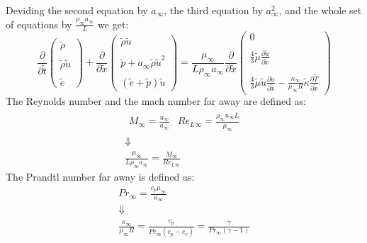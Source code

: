 \documentclass[11pt, a4paper]{article}
\newcommand{\parder}[2]{\frac{\partial {#1}}{\partial {#2}}}
\begin{document}
Deviding the second equation by $a_\infty$, the third equation by $a_\infty^2$, and the whole set of equations by $\displaystyle\frac{\rho_\infty a_\infty}{L}$ we get:
\begin{equation}
    \parder{}{\tilde{t}}\begin{pmatrix}
        \tilde{\rho} \\\\
        \tilde{\rho}\tilde{u} \\\\
        \tilde{e}
    \end{pmatrix}+\parder{}{\tilde{x}}\begin{pmatrix}
        \tilde{\rho}\tilde{u} \\\\
        \tilde{p}+a_\infty\tilde{\rho}\tilde{u}^2 \\\\
        \left(\tilde{e}+\tilde{p}\right)\tilde{u}
    \end{pmatrix}=\frac{\mu_\infty}{L\rho_\infty a_\infty}\parder{}{\tilde{x}}\begin{pmatrix}
        0 \\\\
        \displaystyle\frac{4}{3}\tilde{\mu} \parder{\tilde{u}}{\tilde{x}} \\\\
        \displaystyle\frac{4}{3}\tilde{\mu}\tilde{u}\parder{\tilde{u}}{\tilde{x}}-\frac{\kappa_\infty}{\mu_\infty R}\tilde{\kappa}\parder{\tilde{T}}{\tilde{x}}
    \end{pmatrix}
\end{equation}
The Reynolds number and the mach number far away are defined as:
\begin{equation}
    \begin{array}{c}
        \begin{matrix}
            \displaystyle M_\infty=\frac{u_\infty}{a_\infty} & \displaystyle Re_{L\infty}=\frac{\rho_\infty u_\infty L}{\mu_\infty}
        \end{matrix} \\
        \Downarrow \\
        \displaystyle \frac{\mu_\infty}{L\rho_\infty a_\infty}=\frac{M_\infty}{Re_{L\infty}}
    \end{array}
\end{equation}
The Prandtl number far away is defined as:
\begin{equation}
    \begin{array}{c}
        \displaystyle Pr_\infty=\frac{c_p\mu_\infty}{\kappa_\infty} \\
        \Downarrow \\
        \displaystyle\frac{\kappa_\infty}{\mu_\infty R}=\frac{c_p}{Pr_\infty \left(c_p-c_v\right)}=\frac{\gamma}{Pr_\infty\left(\gamma-1\right)}
    \end{array}
\end{equation}
\end{document}
